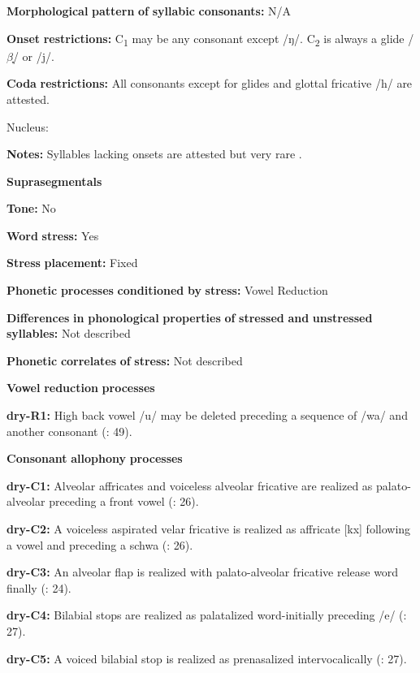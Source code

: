 \textbf{Morphological} \textbf{pattern} \textbf{of} \textbf{syllabic} \textbf{consonants:} N/A

\textbf{Onset} \textbf{restrictions:} C\textsubscript{1} may be any consonant except /ŋ/. C\textsubscript{2} is always a glide /$\beta ̞$/ or /j/.

\textbf{Coda} \textbf{restrictions:} All consonants except for glides and glottal fricative /h/ are attested.

Nucleus:

\textbf{Notes:} Syllables lacking onsets are attested but very rare \citep[19]{Dhakal2012}.

\textbf{Suprasegmentals}

\textbf{Tone:} No

\textbf{Word} \textbf{stress:} Yes

\textbf{Stress} \textbf{placement:} Fixed

\textbf{Phonetic} \textbf{processes} \textbf{conditioned} \textbf{by} \textbf{stress:} Vowel Reduction

\textbf{Differences} \textbf{in} \textbf{phonological} \textbf{properties} \textbf{of} \textbf{stressed} \textbf{and} \textbf{unstressed} \textbf{syllables:} Not described

\textbf{Phonetic} \textbf{correlates} \textbf{of} \textbf{stress:} Not described

\textbf{Vowel} \textbf{reduction} \textbf{processes}

\textbf{dry-R1:} High back vowel /u/ may be deleted preceding a sequence of /wa/ and another consonant (\citealt{KotapishKotapish1973}: 49).

\textbf{Consonant} \textbf{allophony} \textbf{processes}

\textbf{dry-C1:} Alveolar affricates and voiceless alveolar fricative are realized as palato-alveolar preceding a front vowel (\citealt{KotapishKotapish1973}: 26).

\textbf{dry-C2:} A voiceless aspirated velar fricative is realized as affricate [kx] following a vowel and preceding a schwa (\citealt{KotapishKotapish1973}: 26).

\textbf{dry-C3:} An alveolar flap is realized with palato-alveolar fricative release word finally (\citealt{KotapishKotapish1973}: 24).

\textbf{dry-C4:} Bilabial stops are realized as palatalized word-initially preceding /e/ (\citealt{KotapishKotapish1973}: 27).

\textbf{dry-C5:} A voiced bilabial stop is realized as prenasalized intervocalically (\citealt{KotapishKotapish1973}: 27).

